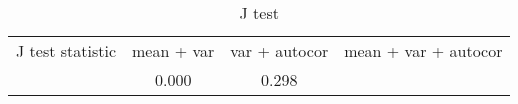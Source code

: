 
    \begin{table}\caption{J test}
\centering
    \begin{tabular}{|l|c|c|c|}
    \toprule
    	 J test statistic & mean + var & var + autocor & mean + var + autocor  \\
    \miderule00 & 0.000 & 0.298\\

      \bottomrule
      \end{tabular}
      \end{table}